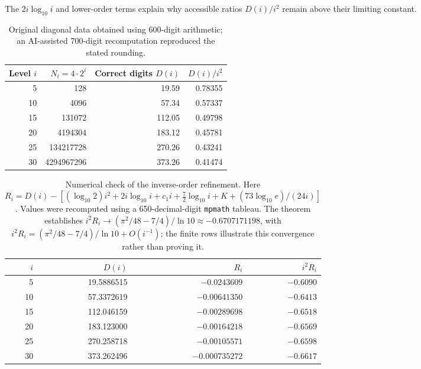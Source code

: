 \documentclass[11pt]{article}
\begin{document}
The $2i\log_{10}i$ and lower-order terms explain why accessible ratios $D(i)/i^2$ remain above their limiting constant.
\begin{table}[ht]\centering\small
\begin{tabular}{rrrr}\toprule Level $i$ & $N_i=4\cdot2^i$ & Correct digits $D(i)$ & $D(i)/i^2$\\\midrule
5&128&19.59&0.78355\\10&4096&57.34&0.57337\\15&131072&112.05&0.49798\\20&4194304&183.12&0.45781\\25&134217728&270.26&0.43241\\30&4294967296&373.26&0.41474\\\bottomrule\end{tabular}
\caption{Original diagonal data obtained using 600-digit arithmetic; an AI-assisted 700-digit recomputation reproduced the stated rounding.}\label{tab:tower}
\end{table}
\begin{table}[ht]
\centering\small
\begin{tabular}{rrrr}
\toprule
$i$ & $D(i)$ & $R_i$ & $i^2R_i$\\
\midrule
5  & 19.5886515 & $-0.0243609$ & $-0.6090$\\
10 & 57.3372619 & $-0.00641350$ & $-0.6413$\\
15 & 112.046159 & $-0.00289698$ & $-0.6518$\\
20 & 183.123000 & $-0.00164218$ & $-0.6569$\\
25 & 270.258718 & $-0.00105571$ & $-0.6598$\\
30 & 373.262496 & $-0.000735272$ & $-0.6617$\\
\bottomrule
\end{tabular}
\caption{Numerical check of the inverse-order refinement. Here
$R_i=D(i)-[(\log_{10}2)i^2+2i\log_{10}i+c_1i+
\tfrac72\log_{10}i+K+(73\log_{10}e)/(24i)]$.
Values were recomputed using a 650-decimal-digit \texttt{mpmath} tableau.
The theorem establishes $i^2R_i\to(\pi^2/48-7/4)/\ln 10\approx-0.6707171198$, with $i^2R_i=(\pi^2/48-7/4)/\ln 10+O(i^{-1})$; the finite rows illustrate this convergence rather than proving it.}
\label{tab:digits-residual}
\end{table}
\end{document}
